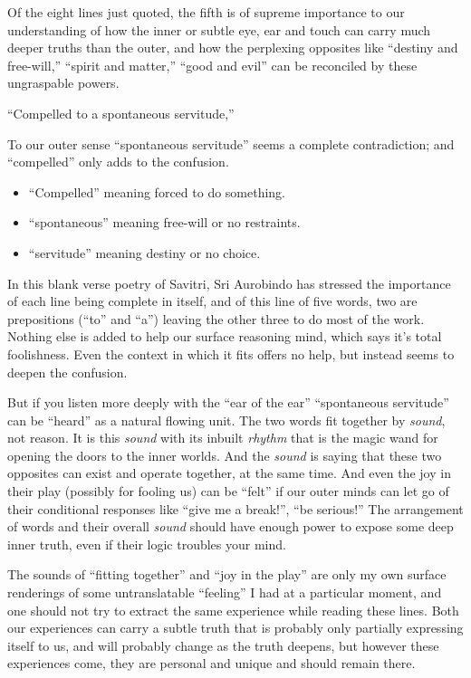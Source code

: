 \documentclass[12pt,a4paper]{book}
\begin{document}
Of the eight lines just quoted, the fifth is of supreme importance to
our understanding of how the inner or subtle eye, ear and touch can
carry much deeper truths than the outer, and how the perplexing
opposites like ``destiny and free-will,'' ``spirit and matter,''
``good and evil'' can be reconciled by these ungraspable powers.

``Compelled to a spontaneous servitude,''

To our outer sense ``spontaneous servitude'' seems a complete
contradiction; and ``compelled'' only adds to the confusion.

\begin{itemize}
\item [] ``Compelled'' meaning forced to do something.
\item [] ``spontaneous'' meaning free-will or no restraints.
\item [] ``servitude'' meaning destiny or no choice.
\end{itemize}

In this blank verse poetry of Savitri, Sri Aurobindo has stressed the
importance of each line being complete in itself, and of this line of
five words, two are prepositions (``to'' and ``a'') leaving the other
three to do most of the work. Nothing else is added to help our
surface reasoning mind, which says it's total foolishness. Even the
context in which it fits offers no help, but instead seems to deepen
the confusion.

But if you listen more deeply with the ``ear of the ear''
``spontaneous servitude'' can be ``heard'' as a natural flowing
unit. The two words fit together by \emph{sound}, not reason. It is
this \emph{sound} with its inbuilt \emph{rhythm} that is the magic
wand for opening the doors to the inner worlds. And the \emph{sound}
is saying that these two opposites can exist and operate together, at
the same time. And even the joy in their play (possibly for fooling
us) can be ``felt'' if our outer minds can let go of their conditional
responses like ``give me a break!'', ``be serious!''  The arrangement
of words and their overall \emph{sound} should have enough power to
expose some deep inner truth, even if their logic troubles your mind.

The sounds of ``fitting together'' and ``joy in the play'' are only my
own surface renderings of some untranslatable ``feeling'' I had at a
particular moment, and one should not try to extract the same
experience while reading these lines. Both our experiences can carry a
subtle truth that is probably only partially expressing itself to us,
and will probably change as the truth deepens, but however these
experiences come, they are personal and unique and should remain
there.
\end{document}
